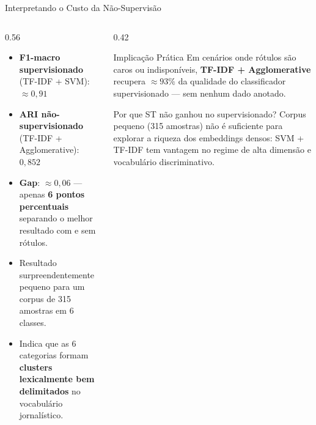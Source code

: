 \documentclass[aspectratio=169]{beamer}
\begin{document}
\begin{frame}{Interpretando o Custo da Não-Supervisão}
  \begin{columns}[T]
    \begin{column}{0.56\textwidth}
      \begin{itemize}
        \item \textbf{F1-macro supervisionado} (TF-IDF + SVM): $\approx 0{,}91$
        \item \textbf{ARI não-supervisionado} (TF-IDF + Agglomerative): $0{,}852$
        \item \textbf{Gap}: $\approx 0{,}06$ — apenas \textbf{6 pontos percentuais}
        separando o melhor resultado com e sem rótulos.
        \item Resultado surpreendentemente pequeno para um corpus de 315 amostras em 6 classes.
        \item Indica que as 6 categorias formam \textbf{clusters lexicalmente bem delimitados}
              no vocabulário jornalístico.
      \end{itemize}
    \end{column}
    \begin{column}{0.42\textwidth}
      \begin{alertblock}{Implicação Prática}
        \small Em cenários onde rótulos são caros ou indisponíveis,
        \textbf{TF-IDF + Agglomerative} recupera $\approx 93\%$ da qualidade
        do classificador supervisionado — sem nenhum dado anotado.
      \end{alertblock}
      \vspace{0.4em}
      \begin{block}{\small Por que ST não ganhou no supervisionado?}
        \small Corpus pequeno (315 amostras) não é suficiente para explorar a
        riqueza dos embeddings densos: SVM + TF-IDF tem vantagem no regime
        de alta dimensão e vocabulário discriminativo.
      \end{block}
    \end{column}
  \end{columns}
\end{frame}
\end{document}

